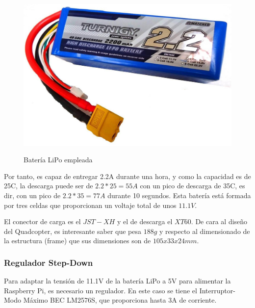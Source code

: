 \documentclass[twoside,11pt]{book}
\begin{document}
\begin{figure}[h!]
\begin{center}
\includegraphics[scale=0.09,bb=0 0 1433 979]{images/LiPo.png} \\
\caption{Batería LiPo empleada}
\end{center}
\end{figure}


Por tanto, es capaz de entregar 2.2A durante una hora, y como la capacidad es de 25C, la descarga puede ser de $2.2*25=55A$ con un pico de descarga de 35C, es dir, con un pico de $2.2*35=77A$ durante 10 segundos. Esta batería está formada por tres celdas que proporcionan un voltaje total de unos $11.1V$.

El conector de carga es el $JST-XH$ y el de descarga el $XT60$. De cara al diseño del Quadcopter, es interesante saber que pesa $188g$ y respecto al dimensionado de la estructura (frame) que sus dimensiones son de $105x33x24mm$.

\subsubsection*{Regulador Step-Down}
Para adaptar la tensión de 11.1V de la batería LiPo a 5V para alimentar la Raspberry Pi, es necesario un regulador. En este caso se tiene el Interruptor-Modo Máximo BEC LM2576S, que proporciona hasta 3A de corriente.

\end{document}
